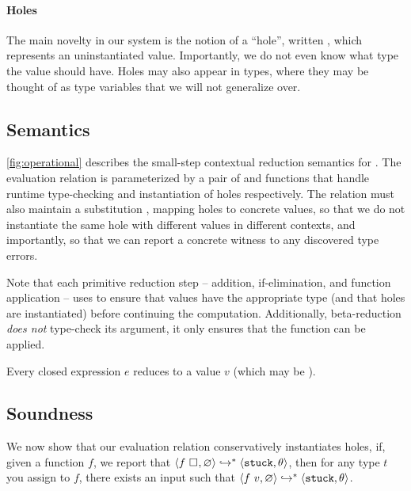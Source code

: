 \paragraph{Holes}
\label{sec:holes}
The main novelty in our system is the notion of a ``hole'', written
\ehole{}, which represents an uninstantiated value. Importantly, we do
not even know what type the value should have. Holes may also appear in
types, where they may be thought of as type variables that we will not
generalize over.

\subsection{Semantics}
\label{sec:semantics}


\autoref{fig:operational} describes the small-step contextual reduction
semantics for \lang. The evaluation relation is parameterized by a pair
of \forcesym and \gensym functions that handle runtime type-checking and
instantiation of holes respectively. The relation must also maintain a
substitution \su, mapping holes to concrete values, so that we do not
instantiate the same hole with different values in different contexts,
and importantly, so that we can report a concrete witness to any
discovered type errors.

Note that each primitive reduction step -- addition, if-elimination, and
function application -- uses \forcesym to ensure that values have the
appropriate type (and that holes are instantiated) before continuing the
computation. Additionally, beta-reduction \emph{does not} type-check its
argument, it only ensures that the function can be applied.

\begin{thm}
\label{thm:all-reduce}
  Every closed expression $e$ reduces to a value $v$ (which may be \stuck).
\end{thm}

\subsection{Soundness}
\label{sec:soundness}
We now show that our evaluation relation conservatively instantiates
holes, \ie if, given a function $f$, we report that 
$\langle f \ \square_{}, \varnothing \rangle \hookrightarrow^{*} \langle \mathtt{stuck}, \theta \rangle$,
then for any type $t$ you assign to $f$, there exists an input  such that
$\langle f \ v, \varnothing \rangle \hookrightarrow^{*} \langle \mathtt{stuck}, \theta \rangle$.

